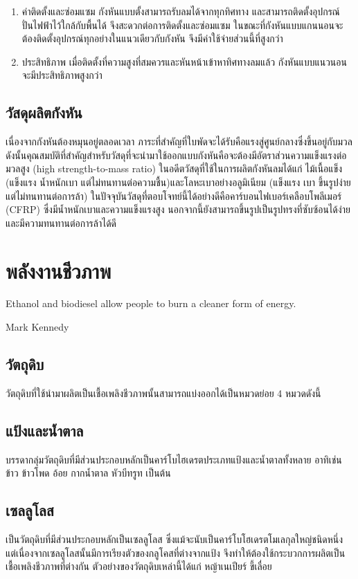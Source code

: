\documentclass[a4paper,nobib,openany,10pt]{tufte-book}
\begin{document}
\begin{enumerate}
\item ค่าติดตั้งและซ่อมแซม กังหันแบบตั้งสามารถรับลมได้จากทุกทิศทาง
และสามารถติดตั้งอุปกรณ์ปั่นไฟฟ้าไว้ใกล้กับพื้นได้
จึงสะดวกต่อการติดตั้งและซ่อมแซม
ในขณะที่กังหันแบบแกนนอนจะต้องติดตั้งอุปกรณ์ทุกอย่างในแนวเดียวกับกังหัน
จึงมีค่าใช้จ่ายส่วนนี้ที่สูงกว่า

\item ประสิทธิภาพ
เมื่อติดตั้งที่ความสูงที่สมควรและหันหน้าเข้าหาทิศทางลมแล้ว
กังหันแบบแนวนอนจะมีประสิทธิภาพสูงกว่า
\end{enumerate}

\section{วัสดุผลิตกังหัน}
\label{sec:orgb34e6e0}
เนื่องจากกังหันต้องหมุนอยู่ตลอดเวลา
ภาระที่สำคัญที่ใบพัดจะได้รับคือแรงสู่ศูนย์กลางซึ่งขึ้นอยู่กับมวล
ดังนั้นคุณสมบัติที่สำคัญสำหรับวัสดุที่จะนำมาใช้ออกแบบกังหันคือจะต้องมีอัตราส่วนความแข็งแรงต่อมวลสูง
(high strength-to-mass ratio) ในอดีตวัสดุที่ใช้ในการผลิตกังหันลมได้แก่
ไม้เนื้อแข็ง (แข็งแรง น้ำหนักเบา
แต่ไม่ทนทานต่อความชื้น)และโลหะเบาอย่างอลูมิเนียม (แข็งแรง เบา
ขึ้นรูปง่าย แต่ไม่ทนทานต่อการล้า)
ในปัจจุบันวัสดุที่ตอบโจทย์นี้ได้อย่างดีคือคาร์บอนไฟเบอร์เคลือบโพลีเมอร์
(CFRP) ซึ่งมีน้ำหนักเบาและความแข็งแรงสูง
นอกจากนี้ยังสามารถขึ้นรูปเป็นรูปทรงที่ซับซ้อนได้ง่ายและมีความทนทานต่อการล้าได้ดี

\chapter{พลังงานชีวภาพ}
\label{sec:org38a6166}

\epigraph{Ethanol and biodiesel allow people to burn a cleaner form of energy.}{Mark Kennedy}

\section{วัตถุดิบ}
\label{sec:org69e97eb}
วัตถุดิบที่ใช้นำมาผลิตเป็นเชื้อเพลิงชีวภาพนั้นสามารถแบ่งออกได้เป็นหมวดย่อย
4 หมวดดังนี้

\section{แป้งและน้ำตาล}
\label{sec:org460d13c}
บรรดากลุ่มวัตถุดิบที่มีส่วนประกอบหลักเป็นคาร์โบไฮเดรตประเภทแป้งและน้ำตาลทั้งหลาย
อาทิเช่น ข้าว ข้าวโพด อ้อย กากน้ำตาล หัวบีทรูท เป็นต้น

\section{เซลลูโลส}
\label{sec:orgd60fa2b}
เป็นวัตถุดิบที่มีส่วนประกอบหลักเป็นเซลลูโลส
ซึ่งแม้จะนับเป็นคาร์โบโฮเดรตโมเลกุลใหญ่ชนิดหนึ่ง
แต่เนื่องจากเซลลูโลสนั้นมีการเรียงตัวของกลูโคสที่ต่างจากแป้ง
จึงทำให้ต้องใช้กระบวกการผลิตเป็นเชื้อเพลิงชีวภาพที่ต่างกัน
ตัวอย่างของวัตถุดิบเหล่านี้ได้แก่ หญ้าเนเปียร์ ขี้เลื่อย
\end{document}
